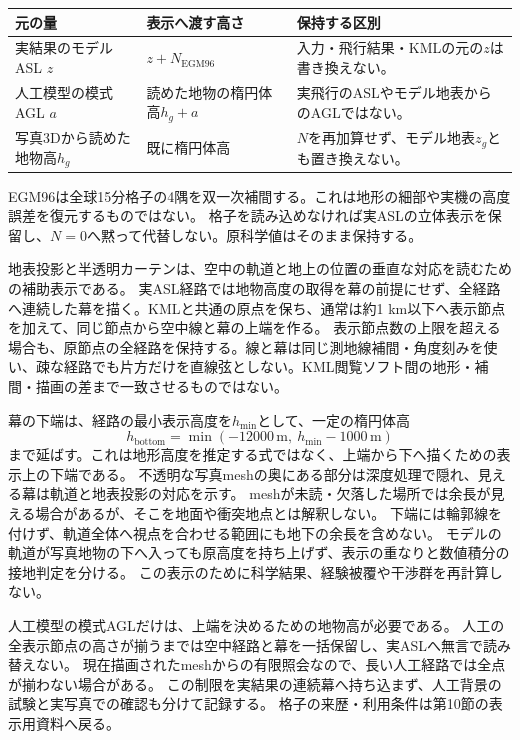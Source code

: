 \documentclass[11pt,a4paper]{article}
\begin{document}
\begin{center}\small
\begin{tabular}{@{}p{.24\linewidth}p{.33\linewidth}p{.37\linewidth}@{}}
\toprule 元の量 & 表示へ渡す高さ & 保持する区別 \\\midrule
実結果のモデルASL $z$ & $z+N_{\mathrm{EGM96}}$ & 入力・飛行結果・KMLの元の$z$は書き換えない。\\
人工模型の模式AGL $a$ & 読めた地物の楕円体高$h_g+a$ & 実飛行のASLやモデル地表からのAGLではない。\\
写真3Dから読めた地物高$h_g$ & 既に楕円体高 & $N$を再加算せず、モデル地表$z_g$とも置き換えない。\\\bottomrule
\end{tabular}
\end{center}
EGM96は全球15分格子の4隅を双一次補間する。これは地形の細部や実機の高度誤差を復元するものではない。
格子を読み込めなければ実ASLの立体表示を保留し、$N=0$へ黙って代替しない。原科学値はそのまま保持する。

地表投影と半透明カーテンは、空中の軌道と地上の位置の垂直な対応を読むための補助表示である。
実ASL経路では地物高度の取得を幕の前提にせず、全経路へ連続した幕を描く。KMLと共通の原点を保ち、通常は約1 km以下へ表示節点を加えて、同じ節点から空中線と幕の上端を作る。
表示節点数の上限を超える場合も、原節点の全経路を保持する。線と幕は同じ測地線補間・角度刻みを使い、疎な経路でも片方だけを直線弦としない。KML閲覧ソフト間の地形・補間・描画の差まで一致させるものではない。

幕の下端は、経路の最小表示高度を$h_{\min}$として、一定の楕円体高
\[
 h_{\mathrm{bottom}}=\min(-12000\,\mathrm{m},\ h_{\min}-1000\,\mathrm{m})
\]
まで延ばす。これは地形高度を推定する式ではなく、上端から下へ描くための表示上の下端である。
不透明な写真meshの奥にある部分は深度処理で隠れ、見える幕は軌道と地表投影の対応を示す。
meshが未読・欠落した場所では余長が見える場合があるが、そこを地面や衝突地点とは解釈しない。
下端には輪郭線を付けず、軌道全体へ視点を合わせる範囲にも地下の余長を含めない。
モデルの軌道が写真地物の下へ入っても原高度を持ち上げず、表示の重なりと数値積分の接地判定を分ける。
この表示のために科学結果、経験被覆や干渉群を再計算しない。

人工模型の模式AGLだけは、上端を決めるための地物高が必要である。
人工の全表示節点の高さが揃うまでは空中経路と幕を一括保留し、実ASLへ無言で読み替えない。
現在描画されたmeshからの有限照会なので、長い人工経路では全点が揃わない場合がある。
この制限を実結果の連続幕へ持ち込まず、人工背景の試験と実写真での確認も分けて記録する。
格子の来歴・利用条件は第10節の表示用資料へ戻る。
\end{document}
